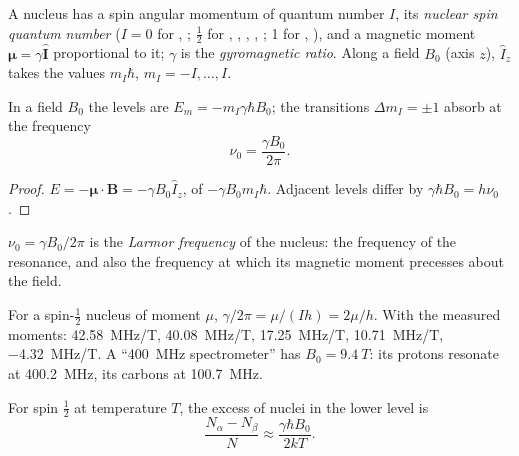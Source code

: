 \begin{definition}\label{def:b3:advanced-nmr:nuclear-spin}
A nucleus has a spin angular momentum of quantum number $I$, its
\emph{nuclear spin quantum number} ($I = 0$
for , ; $\frac12$ for , , , ,
; 1 for , ), and a magnetic moment $\boldsymbol\mu = \gamma\hat{\mathbf
I}$ proportional to it; $\gamma$ is the \emph{gyromagnetic ratio}. Along a field $B_0$ (axis $z$), $\hat I_z$ takes the values $m_I\hbar$,
$m_I = -I, \dots, I$.
\end{definition}

\begin{proposition}\label{prop:b3:advanced-nmr:zeeman}
In a field $B_0$ the levels are $E_m = -m_I\gamma\hbar B_0$; the transitions $\Delta m_I = \pm1$
absorb at the frequency
\[
\nu_0 = \frac{\gamma B_0}{2\pi}.
\]
\end{proposition}

\begin{proof}
$E = -\boldsymbol\mu\cdot\mathbf B = -\gamma B_0\hat I_z$, of  $-\gamma B_0m_I\hbar$. Adjacent
levels differ by $\gamma\hbar B_0 = h\nu_0$.
\end{proof}

\begin{definition}\label{def:b3:advanced-nmr:larmor}
$\nu_0 = \gamma B_0/2\pi$ is the \emph{Larmor frequency} of the
nucleus: the frequency of the resonance, and also the frequency at which its
magnetic moment precesses about the field.
\end{definition}

\begin{example}\label{ex:b3:advanced-nmr:nuclei}
For a spin-$\frac12$ nucleus of moment $\mu$, $\gamma/2\pi = \mu/(Ih) = 2\mu/h$. With the
measured moments:  \qty{42.58}{MHz/T},  \qty{40.08}{MHz/T}, 
\qty{17.25}{MHz/T},  \qty{10.71}{MHz/T},  \qty{-4.32}{MHz/T}. A
``\qty{400}{MHz} spectrometer'' has $B_0 = \qty{9.4}{T}$: its protons resonate at
\qty{400.2}{MHz}, its carbons at \qty{100.7}{MHz}.
\end{example}

\begin{proposition}\label{prop:b3:advanced-nmr:populations}
For spin $\frac12$ at temperature $T$, the excess of nuclei in the lower level is
\[
\frac{N_\alpha - N_\beta}{N} \approx \frac{\gamma\hbar B_0}{2kT}.
\]
\end{proposition}

